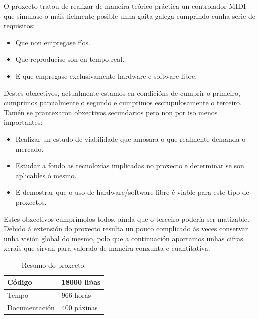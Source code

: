  O proxecto tratou de realizar de maneira teórico-práctica un controlador MIDI
 que simulase o máis fielmente posible unha gaita galega cumprindo cunha serie
 de requisitos:
 
 \begin{itemize}
  \item Que non empregase fíos.
  \item Que reproducise son en tempo real.
  \item E que empregase exclusivamente hardware e software libre.
 \end{itemize}
 
 Destes obxectivos, actualmente estamos en condicións de cumprir o primeiro,
 cumprimos parcialmente o segundo e cumprimos escrupulosamente o terceiro. \\
 
 Tamén se prantexaron obxectivos secundarios pero non por iso menos importantes:
 
 \begin{itemize}
  \item Realizar un estudo de viabilidade que amosara o que realmente demanda o
    mercado.
  \item Estudar a fondo as tecnoloxías implicadas no proxecto e determinar se
    son aplicables ó mesmo.
  \item E demostrar que o uso de hardware/software libre é viable para este tipo
    de proxectos.
 \end{itemize}
 
 Estes obxectivos cumprímolos todos, aínda que o terceiro podería ser
 matizable. \\
 
 Debido á extensión do proxecto resulta un pouco complicado ás veces conservar
 unha visión global do mesmo, polo que a continuación aportamos unhas cifras
 xerais que sirvan para valoralo de maneira conxunta e cuantitativa. \\
 
 \begin{table}[htbp]
  \centering
  \begin{tabular}{|l|l|}
   \hline
   Código & 18000 liñas \\
   \hline
   Tempo & 966 horas \\
   \hline
   Documentación & 400 páxinas \\
   \hline
  \end{tabular}
  \caption{Resumo do proxecto.}
  \label{tabla:ResumoProxecto}
 \end{table}
 
